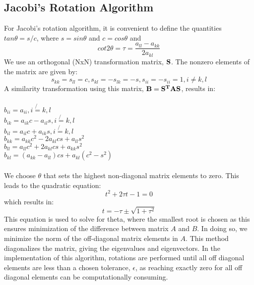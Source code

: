 \documentclass[10pt,showpacs,preprintnumbers,footinbib,amsmath,amssymb,aps,prl,twocolumn,groupedaddress,superscriptaddress,showkeys]{revtex4-1}
\begin{document}
\subsection{Jacobi's Rotation Algorithm}
For Jacobi's rotation algorithm, it is convenient to define the quantities $tan\theta = s/c$, where $s = sin\theta$ and $c = cos\theta$ and 
\begin{equation}
cot 2 \theta = \tau = \frac{a_{ll} - a_{kk}}{2a_{kl}}
\end{equation}
We use an orthogonal (NxN) transformation matrix, $\bf{S}$. The nonzero elements of the matrix are given by:
\begin{equation}
s_{kk} = s_{ll} = c, s_{kl} = -s_{lk} = -s, s_{ii} = -s_{ii}=1, i \ne k,l
\end{equation}
A similarity transformation using this matrix, $\bf{B} = \bf{S^T}\bf{A}\bf{S}$, results in: \\
\\
$b_{ii}=a_{ii}, i\not{=}k, l$\\
	$b_{ik}=a_{ik}c-a_{il}s, i\not{=}k, l$\\
	$b_{il}=a_{il}c+a_{ik}s, i\not{=}k, l$\\
	$b_{kk}=a_{kk}c^{2}-2a_{kl}cs+a_{ll}s^{2}$\\
	$b_{ll}=a_{ll}c^{2}+2a_{kl}cs+a_{kk}s^{2}$\\
	$b_{kl}=(a_{kk}-a_{ll})cs+a_{kl}(c^{2}-s^{2})$ \\
	\\
We choose $\theta$ that sets the highest non-diagonal matrix elements to zero. This leads to the quadratic equation:
\begin{equation}
t^2+2\tau t -1=0
\end{equation}
which results in:
\begin{equation}
t = -\tau \pm \sqrt{1+\tau^2}
\end{equation}
This equation is used to solve for theta, where the smallest root is chosen as this ensures minimization of the difference between matrix $A$ and $B$. In doing so, we minimize the norm of the off-diagonal matrix elements in $A$. This method diagonalizes the matrix, giving the eigenvalues and eigenvectors. In the implementation of this algorithm, rotations are performed until all off diagonal elements are less than a chosen tolerance, $\epsilon$, as reaching exactly zero for all off diagonal elements can be computationally consuming. 
\end{document}
